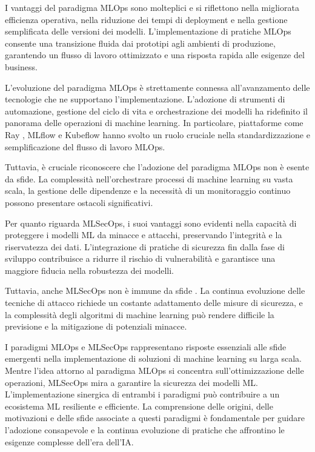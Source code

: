 I vantaggi del paradigma MLOps sono molteplici e si riflettono nella migliorata efficienza operativa, nella riduzione dei tempi di deployment e nella gestione semplificata delle versioni dei modelli. L'implementazione di pratiche MLOps consente una transizione fluida dai prototipi agli ambienti di produzione, garantendo un flusso di lavoro ottimizzato e una risposta rapida alle esigenze del business.

L'evoluzione del paradigma MLOps è strettamente connessa all'avanzamento delle tecnologie che ne supportano l'implementazione. L'adozione di strumenti di automazione, gestione del ciclo di vita e orchestrazione dei modelli ha ridefinito il panorama delle operazioni di machine learning. In particolare, piattaforme come Ray \cite{ray}, MLflow \cite{mlflow} e Kubeflow \cite{kubeflow} hanno svolto un ruolo cruciale nella standardizzazione e semplificazione del flusso di lavoro MLOps.

Tuttavia, è cruciale riconoscere che l'adozione del paradigma MLOps non è esente da sfide. La complessità nell'orchestrare processi di machine learning su vasta scala, la gestione delle dipendenze e la necessità di un monitoraggio continuo possono presentare ostacoli significativi.

Per quanto riguarda MLSecOps, i suoi vantaggi sono evidenti nella capacità di proteggere i modelli ML da minacce e attacchi, preservando l'integrità e la riservatezza dei dati. L'integrazione di pratiche di sicurezza fin dalla fase di sviluppo contribuisce a ridurre il rischio di vulnerabilità e garantisce una maggiore fiducia nella robustezza dei modelli.

Tuttavia, anche MLSecOps non è immune da sfide \cite{adv_ml_2}. La continua evoluzione delle tecniche di attacco richiede un costante adattamento delle misure di sicurezza, e la complessità degli algoritmi di machine learning può rendere difficile la previsione e la mitigazione di potenziali minacce.

I paradigmi MLOps e MLSecOps rappresentano risposte essenziali alle sfide emergenti nella implementazione di soluzioni di machine learning su larga scala. Mentre l'idea attorno al paradigma MLOps si concentra sull'ottimizzazione delle operazioni, MLSecOps mira a garantire la sicurezza dei modelli ML. L'implementazione sinergica di entrambi i paradigmi può contribuire a un ecosistema ML resiliente e efficiente. La comprensione delle origini, delle motivazioni e delle sfide associate a questi paradigmi è fondamentale per guidare l'adozione consapevole e la continua evoluzione di pratiche che affrontino le esigenze complesse dell'era dell'IA.
